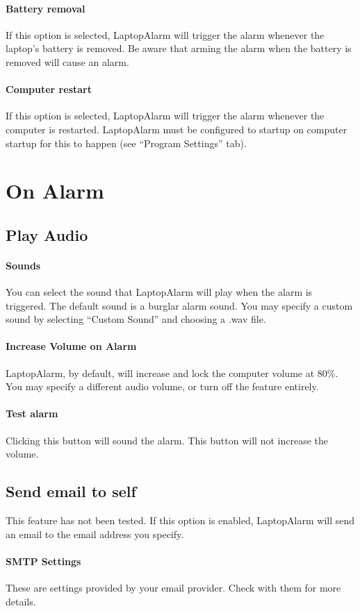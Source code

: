 \documentclass[12pt, letterpaper]{article}
\begin{document}
\paragraph{Battery removal}
If this option is selected, LaptopAlarm will trigger the alarm whenever the laptop's battery is removed. Be aware that arming the alarm when the battery is removed will cause an alarm.
\paragraph{Computer restart}
If this option is selected, LaptopAlarm will trigger the alarm whenever the computer is restarted. LaptopAlarm must be configured to startup on computer startup for this to happen (see ``Program Settings'' tab).

\section{On Alarm}
\subsection{Play Audio}
\paragraph{Sounds}
You can select the sound that LaptopAlarm will play when the alarm is triggered. The default sound is a burglar alarm sound. You may specify a custom sound by selecting ``Custom Sound'' and choosing a .wav file.
\paragraph{Increase Volume on Alarm} LaptopAlarm, by default, will increase and lock the computer volume at 80\%. You may specify a different audio volume, or turn off the feature entirely.
\paragraph{Test alarm} Clicking this button will sound the alarm. This button will not increase the volume.

\subsection{Send email to self}
This feature has not been tested. If this option is enabled, LaptopAlarm will send an email to the email address you specify.
\paragraph{SMTP Settings} These are settings provided by your email provider. Check with them for more details.
\end{document}
